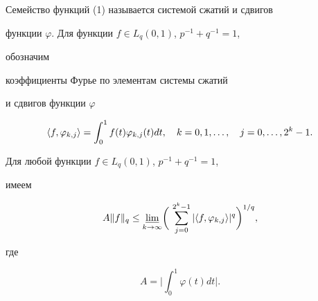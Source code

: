 Семейство функций (1) называется системой сжатий и сдвигов  


функции $\varphi$. Для функции $f\in L_q(0,1)$, $p^{-1}+q^{-1}=1$, 


обозначим 


коэффициенты Фурье по элементам системы сжатий 


и сдвигов функции $\varphi$ 


$$ 


\la f,\varphi_{k,j}\ra=\int^1_0 f(t)\varphi_{k,j}(t)dt, 


\quad k=0,1,\dotsc,\quad j=0,\dotsc,2^k-1. 


$$ 


 


\begin{thm} Для любой функции $f\in L_q(0,1)$, $p^{-1}+q^{-1}=1$, 


имеем 


\begin{equation} 


A\|f\|_q\le\underset{k\to\infty}{\varliminf}\bigg(\, 


\sum^{2^k-1}_{j=0}|\la f,\varphi_{k,j}\ra|^q\bigg)^{1/q}, 


\end{equation} 


где 


$$ 


A=\bigg|\int^1_0\varphi(t)dt\bigg|. 


$$ 


\end{thm} 


 


